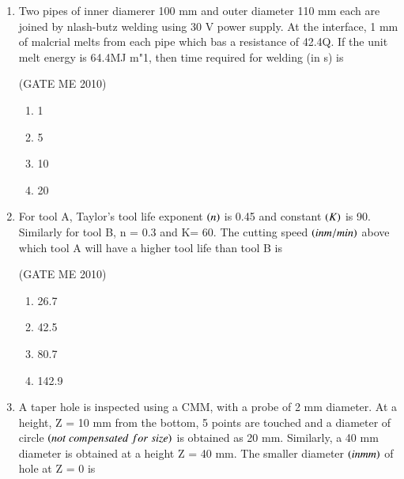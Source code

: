 \documentclass[journal,12pt,onecolumn]{IEEEtran}
\theoremstyle{remark}
\begin{document}
\begin{enumerate}
\hfill{(GATE  ME 2010)}


\begin{multicols}{4}
\begin{enumerate}
\item 50.5
\item 38.5
\item 56.5
\item 68.5
\end{enumerate}
\end{multicols}


\item Two pipes of inner diamerer 100 mm and outer diameter 110 mm each are joined by nlash-butz welding using 30 V power supply. At the interface, 1 mm of malcrial melts from each pipe which bas a resistance of 42.4Q. If the unit melt energy is 64.4MJ m"1, then time required for welding (in s) is

\hfill{(GATE  ME 2010)}


\begin{multicols}{4}
\begin{enumerate}
\item 1
\item 5
\item 10
\item 20
\end{enumerate}
\end{multicols}

\item For tool A, Taylor's tool life exponent $\left(n\right)$ is 0.45 and constant $\left(K\right)$ is 90. Similarly for tool B, n = 0.3 and K= 60. The cutting speed $\left(inm/min\right)$ above which tool A will have a higher tool life than tool B is

\hfill{(GATE  ME 2010)}\\

\begin{multicols}{4}
\begin{enumerate}
\item 26.7
\item 42.5
\item 80.7
\item 142.9
\end{enumerate}
\end{multicols}

\item A taper hole is inspected using a CMM, with a probe of 2 mm diameter. At a height, Z = 10 mm from the bottom, 5 points are touched and a diameter of circle $\left(not\;compensated\;for\;size\right)$ is obtained as 20 mm. Similarly, a 40 mm diameter is obtained at a height Z = 40 mm. The smaller diameter $\left(in mm\right)$ of hole at Z = 0 is



\end{enumerate}
\end{document}
